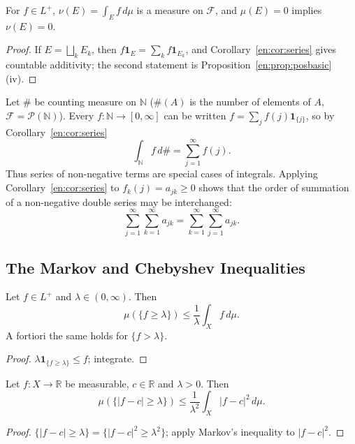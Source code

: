 \documentclass[11pt]{article}
\makeatletter
\newcommand{\envlabel}[1]{\protected@edef\@currentlabel{\themathenv}\label{#1}}
\makeatother
\begin{document}
\begin{corollary}\envlabel{en:cor:measure}
For $f\in L^{+}$, $\nu(E)=\int_{E}f\,d\mu$ is a measure on $\mathcal{F}$, and $\mu(E)=0$ implies $\nu(E)=0$.
\end{corollary}

\begin{proof}
If $E=\bigsqcup_{k}E_{k}$, then $f\mathbf{1}_{E}=\sum_{k}f\mathbf{1}_{E_{k}}$, and Corollary~\ref{en:cor:series} gives countable additivity; the second statement is Proposition~\ref{en:prop:posbasic}(iv).
\end{proof}

\begin{example}
Let $\#$ be counting measure on $\mathbb{N}$ ($\#(A)$ is the number of elements of $A$, $\mathcal{F}=\mathcal{P}(\mathbb{N})$). Every $f:\mathbb{N}\to[0,\infty]$ can be written $f=\sum_{j}f(j)\mathbf{1}_{\{j\}}$, so by Corollary~\ref{en:cor:series}
\[
\int_{\mathbb{N}}f\,d\#=\sum_{j=1}^{\infty}f(j).
\]
Thus series of non-negative terms are special cases of integrals. Applying Corollary~\ref{en:cor:series} to $f_{k}(j)=a_{jk}\geq0$ shows that the order of summation of a non-negative double series may be interchanged:
\[
\sum_{j=1}^{\infty}\sum_{k=1}^{\infty}a_{jk}=\sum_{k=1}^{\infty}\sum_{j=1}^{\infty}a_{jk}.
\]
\end{example}

\subsection{The Markov and Chebyshev Inequalities}

\begin{proposition}\envlabel{en:prop:markov}
Let $f\in L^{+}$ and $\lambda\in(0,\infty)$. Then
\[
\mu(\{f\geq\lambda\})\leq\frac{1}{\lambda}\int_{X}f\,d\mu.
\]
A fortiori the same holds for $\{f>\lambda\}$.
\end{proposition}

\begin{proof}
$\lambda\mathbf{1}_{\{f\geq\lambda\}}\leq f$; integrate.
\end{proof}

\begin{corollary}
Let $f:X\to\mathbb{R}$ be measurable, $c\in\mathbb{R}$ and $\lambda>0$. Then
\[
\mu(\{|f-c|\geq\lambda\})\leq\frac{1}{\lambda^{2}}\int_{X}|f-c|^{2}\,d\mu.
\]
\end{corollary}

\begin{proof}
$\{|f-c|\geq\lambda\}=\{|f-c|^{2}\geq\lambda^{2}\}$; apply Markov's inequality to $|f-c|^{2}$.
\end{proof}
\end{document}
